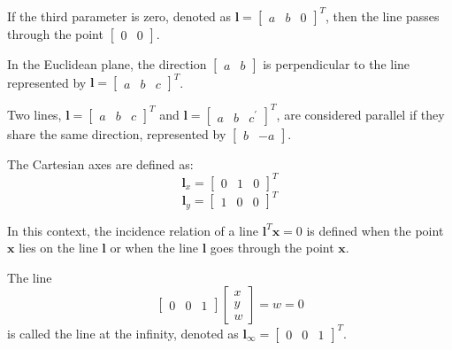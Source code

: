\begin{property}
    If the third parameter is zero, denoted as $\mathbf{l}=\begin{bmatrix} a & b & 0 \end{bmatrix}^T$, then the line passes through the point $\begin{bmatrix} 0 & 0 \end{bmatrix}$. 
\end{property}
\begin{property}
    In the Euclidean plane, the direction $\begin{bmatrix} a & b \end{bmatrix}$ is perpendicular to the line represented by $\mathbf{l}=\begin{bmatrix} a & b & c \end{bmatrix}^T$.
\end{property}
\begin{property}
    Two lines, $\mathbf{l}=\begin{bmatrix} a & b & c \end{bmatrix}^T$ and $\mathbf{l}=\begin{bmatrix} a & b & c^\prime \end{bmatrix}^T$, are considered parallel if they share the same direction, represented by $\begin{bmatrix} b & -a \end{bmatrix}$.
\end{property}
\begin{example}
    The Cartesian axes are defined as: 
    \[\mathbf{l}_x={\begin{bmatrix} 0 & 1 & 0 \end{bmatrix}}^T\]
    \[\mathbf{l}_y={\begin{bmatrix} 1 & 0 & 0 \end{bmatrix}}^T\]
\end{example}
In this context, the incidence relation of a line $\mathbf{l}^T\mathbf{x}=0$ is defined when the point $\mathbf{x}$ lies on the line $\mathbf{l}$ or when the line $\mathbf{l}$ goes through the point $\mathbf{x}$. 
\begin{definition}
    The line 
    \[\begin{bmatrix} 0 & 0 & 1 \end{bmatrix} \begin{bmatrix} x \\ y \\ w \end{bmatrix}=w=0\] 
    is called the line at the infinity, denoted as $\mathbf{l}_{\infty}={\begin{bmatrix} 0 & 0 & 1 \end{bmatrix}}^T$. 
\end{definition}
